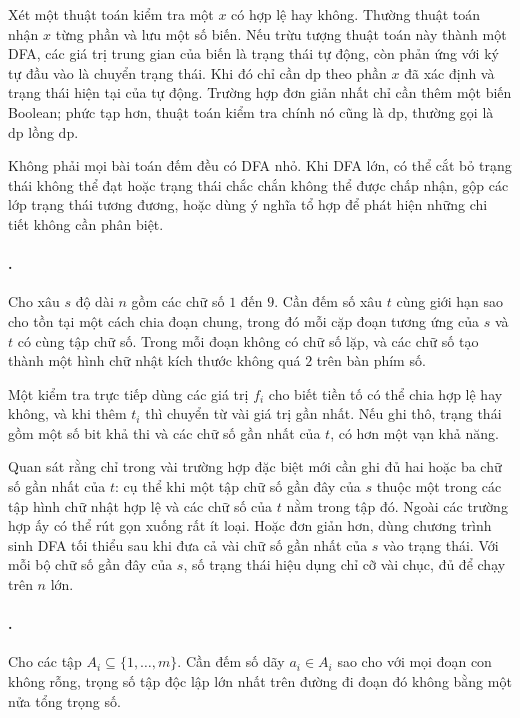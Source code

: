\documentclass[11pt]{article}
\begin{document}
Xét một thuật toán kiểm tra một \(x\) có hợp lệ hay không. Thường thuật toán
nhận \(x\) từng phần và lưu một số biến. Nếu trừu tượng thuật toán này thành
một DFA, các giá trị trung gian của biến là trạng thái tự động, còn phản ứng
với ký tự đầu vào là chuyển trạng thái. Khi đó chỉ cần \(\mathrm{dp}\) theo
phần \(x\) đã xác định và trạng thái hiện tại của tự động. Trường hợp đơn giản
nhất chỉ cần thêm một biến Boolean; phức tạp hơn, thuật toán kiểm tra chính nó
cũng là \(\mathrm{dp}\), thường gọi là \(\mathrm{dp}\) lồng \(\mathrm{dp}\).

Không phải mọi bài toán đếm đều có DFA nhỏ. Khi DFA lớn, có thể cắt bỏ trạng
thái không thể đạt hoặc trạng thái chắc chắn không thể được chấp nhận, gộp các
lớp trạng thái tương đương, hoặc dùng ý nghĩa tổ hợp để phát hiện những chi
tiết không cần phân biệt.

\paragraph{.}
Cho xâu \(s\) độ dài \(n\) gồm các chữ số \(1\) đến \(9\). Cần đếm số xâu
\(t\) cùng giới hạn sao cho tồn tại một cách chia đoạn chung, trong đó mỗi cặp
đoạn tương ứng của \(s\) và \(t\) có cùng tập chữ số. Trong mỗi đoạn không có
chữ số lặp, và các chữ số tạo thành một hình chữ nhật kích thước không quá
\(2\) trên bàn phím số.

Một kiểm tra trực tiếp dùng các giá trị \(f_i\) cho biết tiền tố có thể chia
hợp lệ hay không, và khi thêm \(t_i\) thì chuyển từ vài giá trị gần nhất. Nếu
ghi thô, trạng thái gồm một số bit khả thi và các chữ số gần nhất của \(t\),
có hơn một vạn khả năng.

Quan sát rằng chỉ trong vài trường hợp đặc biệt mới cần ghi đủ hai hoặc ba chữ
số gần nhất của \(t\): cụ thể khi một tập chữ số gần đây của \(s\) thuộc một
trong các tập hình chữ nhật hợp lệ và các chữ số của \(t\) nằm trong tập đó.
Ngoài các trường hợp ấy có thể rút gọn xuống rất ít loại. Hoặc đơn giản hơn,
dùng chương trình sinh DFA tối thiểu sau khi đưa cả vài chữ số gần nhất của
\(s\) vào trạng thái. Với mỗi bộ chữ số gần đây của \(s\), số trạng thái hiệu
dụng chỉ cỡ vài chục, đủ để chạy trên \(n\) lớn.

\paragraph{.}
Cho các tập \(A_i\subseteq\{1,\ldots,m\}\). Cần đếm số dãy
\(a_i\in A_i\) sao cho với mọi đoạn con không rỗng, trọng số tập độc lập lớn
nhất trên đường đi đoạn đó không bằng một nửa tổng trọng số.
\end{document}
